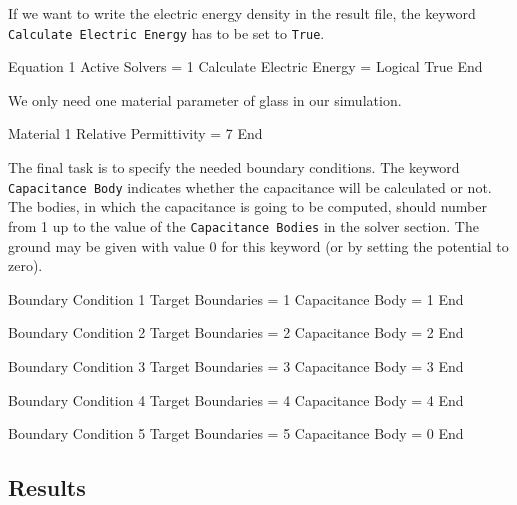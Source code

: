 \begin{flushleft}
If we want to write the electric energy density in the result file, the keyword {\tt Calculate Electric Energy} has to be set to {\tt True}.      

\ttbegin                                                           
Equation 1
  Active Solvers =  1
  Calculate Electric Energy = Logical True
End
\ttend

We only need one material parameter of glass in our simulation.

\ttbegin               
Material 1
  Relative Permittivity = 7
End
\ttend

The final task is to specify the needed boundary conditions.
The keyword {\tt Capacitance Body} indicates whether the capacitance will be calculated or not.
The bodies, in which the capacitance is going to be computed, should number from 1 up to the value of the
{\tt Capacitance Bodies} in the solver section.
The ground may be given with value 0 for this keyword (or by setting the potential to zero).  

\ttbegin
Boundary Condition 1
  Target Boundaries = 1
  Capacitance Body = 1
End

Boundary Condition 2
  Target Boundaries = 2
  Capacitance Body = 2
End

Boundary Condition 3
  Target Boundaries = 3
  Capacitance Body = 3
End

Boundary Condition 4
  Target Boundaries = 4
  Capacitance Body = 4
End

Boundary Condition 5
  Target Boundaries = 5
  Capacitance Body = 0
End
\ttend

\end{flushleft}


\subsection*{Results}

